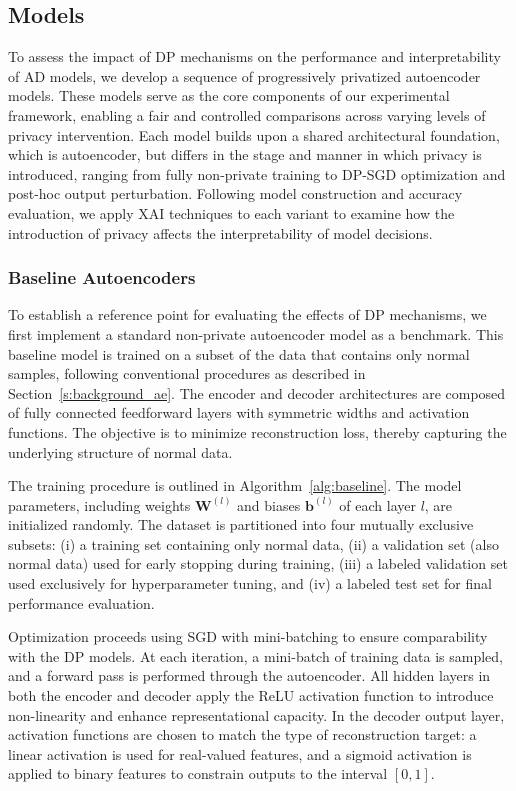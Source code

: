 \subsection{Models}

To assess the impact of DP mechanisms on the performance and interpretability of AD models, we develop a sequence of progressively privatized autoencoder models. These models serve as the core components of our experimental framework, enabling a fair and controlled comparisons across varying levels of privacy intervention. Each model builds upon a shared architectural foundation, which is autoencoder, but differs in the stage and manner in which privacy is introduced, ranging from fully non-private training to DP-SGD optimization and post-hoc output perturbation. Following model construction and accuracy evaluation, we apply XAI techniques to each variant to examine how the introduction of privacy affects the interpretability of model decisions. 

\subsubsection{Baseline Autoencoders} \label{s:method_baseline}

To establish a reference point for evaluating the effects of DP mechanisms, we first implement a standard non-private autoencoder model as a benchmark. This baseline model is trained on a subset of the data that contains only normal samples, following conventional procedures as described in Section~\ref{s:background_ae}. The encoder and decoder architectures are composed of fully connected feedforward layers with symmetric widths and activation functions. The objective is to minimize reconstruction loss, thereby capturing the underlying structure of normal data.



The training procedure is outlined in Algorithm~\ref{alg:baseline}. The model parameters, including weights $\mathbf{W}^{(l)}$ and biases $\mathbf{b}^{(l)}$ of each layer $l$, are initialized randomly. The dataset is partitioned into four mutually exclusive subsets: (i) a training set containing only normal data, (ii) a validation set (also normal data) used for early stopping during training, (iii) a labeled validation set used exclusively for hyperparameter tuning, and (iv) a labeled test set for final performance evaluation.

Optimization proceeds using SGD with mini-batching to ensure comparability with the DP models. At each iteration, a mini-batch of training data is sampled, and a forward pass is performed through the autoencoder. All hidden layers in both the encoder and decoder apply the ReLU activation function to introduce non-linearity and enhance representational capacity. In the decoder output layer, activation functions are chosen to match the type of reconstruction target: a linear activation is used for real-valued features, and a sigmoid activation is applied to binary features to constrain outputs to the interval $[0, 1]$.

